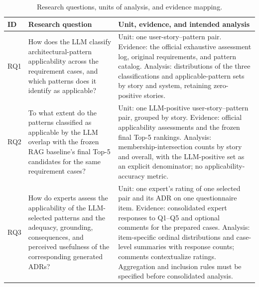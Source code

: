 \begin{table}[t]
\caption{Research questions, units of analysis, and evidence mapping.}
\label{tab:research-questions}
\centering
\small
\begin{tabular}{p{} p{} p{}}
\hline
\textbf{ID} & \textbf{Research question} & \textbf{Unit, evidence, and intended analysis} \\
\hline
RQ1 &
How does the LLM classify architectural-pattern applicability across the requirement cases, and which patterns does it identify as applicable? &
Unit: one user-story--pattern pair.
Evidence: the official exhaustive assessment log, original requirements, and pattern catalog.
Analysis: distributions of the three classifications and applicable-pattern sets by story and system, retaining zero-positive stories. \\
\hline
RQ2 &
To what extent do the patterns classified as applicable by the LLM overlap with the frozen RAG baseline's final Top-5 candidates for the same requirement cases? &
Unit: one LLM-positive user-story--pattern pair, grouped by story.
Evidence: official applicability assessments and the frozen final Top-5 rankings.
Analysis: membership-intersection counts by story and overall, with the LLM-positive set as an explicit denominator; no applicability-accuracy metric. \\
\hline
RQ3 &
How do experts assess the applicability of the LLM-selected patterns and the adequacy, grounding, consequences, and perceived usefulness of the corresponding generated ADRs? &
Unit: one expert's rating of one selected pair and its ADR on one questionnaire item.
Evidence: consolidated expert responses to Q1--Q5 and optional comments for the prepared cases.
Analysis: item-specific ordinal distributions and case-level summaries with response counts; comments contextualize ratings. Aggregation and inclusion rules must be specified before consolidated analysis. \\
\hline
\end{tabular}
\end{table}

